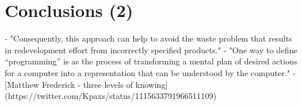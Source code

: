 \chapter{Conclusions (2)}
- "Consequently, this approach can help to avoid the waste problem that results in redevelopment effort from incorrectly specified products." \autocite[10]{sheldon_software_2000}
- "One way to define “programming” is as the process of transforming a mental plan of desired actions for a computer into a representation that can be understood by the computer." \autocite{myers_past_2009}
- [Matthew Frederick - three levels of knowing](https://twitter.com/Kpaxs/status/1115633791966511109)